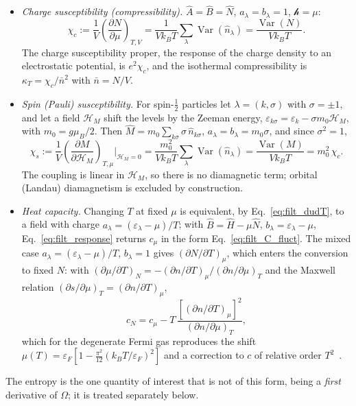 \documentclass[10pt,a4paper]{article}
\theoremstyle{plain}
\theoremstyle{remark}
\newcommand{\Var}{\operatorname{Var}}
\newcommand{\hmag}{\mathcal{H}_M}
\newcommand{\hfield}{\mathscr{h}}  %
\begin{document}
\begin{itemize}
\item \emph{Charge susceptibility (compressibility).} $ \hat A = \hat B = \hat N $,
  $ a_\lambda = b_\lambda = 1 $, $ \hfield = \mu $:
  \[
    \chi_c := \frac{1}{V}\left(\frac{\partial N}{\partial\mu}\right)_{T,V}
    = \frac{1}{Vk_BT}\sum_\lambda\Var(\hat n_\lambda) = \frac{\Var(N)}{Vk_BT} .
  \]
  The charge susceptibility proper, the response of the charge density to an
  electrostatic potential, is $ e^{2}\chi_c $, and the isothermal compressibility
  is $ \kappa_T = \chi_c/\bar n^{2} $ with $ \bar n = N/V $.
\item \emph{Spin (Pauli) susceptibility.} For spin-$ \tfrac12 $ particles let
  $ \lambda = (k, \sigma) $ with $ \sigma = \pm1 $, and let a field $ \hmag{} $ shift
  the levels by the Zeeman energy, $ \varepsilon_{k\sigma} = \varepsilon_k - \sigma
  m_0\hmag{} $, with $ m_0 = g\mu_B/2 $. Then $ \hat M = m_0\sum_{k\sigma}\sigma\,
  \hat n_{k\sigma} $, $ a_\lambda = b_\lambda = m_0\sigma $, and since $ \sigma^{2} = 1 $,
  \[
    \chi_s := \frac{1}{V}\left(\frac{\partial M}{\partial\hmag{}}\right)_{T,\mu}\bigg|_{\hmag{}=0}
    = \frac{m_0^{2}}{Vk_BT}\sum_\lambda\Var(\hat n_\lambda) = \frac{\Var(M)}{Vk_BT}
    = m_0^{2}\,\chi_c .
  \]
  The coupling is linear in $ \hmag{} $, so there is no diamagnetic term;
  orbital (Landau) diamagnetism is excluded by
  construction.
\item \emph{Heat capacity.} Changing $ T $ at fixed $ \mu $ is equivalent, by
  Eq.~\eqref{eq:filt_dudT}, to a field with charge $ a_\lambda = (\varepsilon_\lambda
  - \mu)/T $; with $ \hat B = \hat H - \mu\hat N $, $ b_\lambda = \varepsilon_\lambda - \mu $,
  Eq.~\eqref{eq:filt_response} returns $ c_\mu $ in the form
  Eq.~\eqref{eq:filt_C_fluct}. The mixed case $ a_\lambda = (\varepsilon_\lambda - \mu)/T $,
  $ b_\lambda = 1 $ gives $ (\partial N/\partial T)_\mu $, which enters the
  conversion to fixed $ N $: with $ (\partial\mu/\partial T)_N
  = -(\partial n/\partial T)_\mu/(\partial n/\partial\mu)_T $ and the Maxwell
  relation $ (\partial s/\partial\mu)_T = (\partial n/\partial T)_\mu $,
  \[
    c_N = c_\mu - T\,\frac{[(\partial n/\partial T)_\mu]^{2}}{(\partial n/\partial\mu)_T} ,
  \]
  which for the degenerate Fermi gas reproduces the shift
  $ \mu(T) = \varepsilon_F[1 - \tfrac{\pi^{2}}{12}(k_BT/\varepsilon_F)^{2}] $ and
  a correction to $ c $ of relative order $ T^{2} $~\cite[Sec.~6.3.2]{Honerkamp}.
\end{itemize}
The entropy is the one quantity of interest that is not of this form, being a
\emph{first} derivative of $ \Omega $; it is treated separately below.
\end{document}
